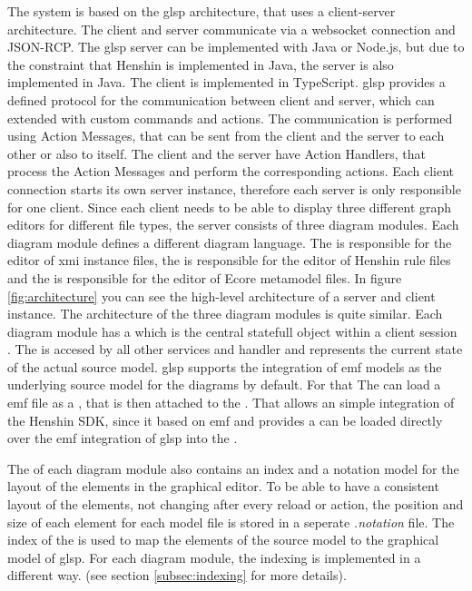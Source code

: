   The system is based on the \ac{glsp} architecture, that uses a client-server architecture. The client and server communicate via a websocket connection and JSON-RCP. The \ac{glsp} server can be implemented with Java or Node.js, but due to the constraint that Henshin is implemented in Java, the server is also implemented in Java. The client is implemented in TypeScript. \ac{glsp} provides a defined protocol for the communication between client and server, which can extended with custom commands and actions. The communication is performed using Action Messages, that can be sent from the client and the server to each other or also to itself. The client and the server have Action Handlers, that process the Action Messages and perform the corresponding actions. Each client connection starts its own server instance, therefore each server is only responsible for one client. \cite{glsp-doc} Since each client needs to be able to display three different graph editors for different file types, the server consists of three diagram modules. Each diagram module defines a different diagram language. The  is responsible for the editor of \ac{xmi} instance files, the  is responsible for the editor of Henshin rule files and the  is responsible for the editor of Ecore metamodel files. In figure \ref{fig:architecture} you can see the high-level architecture of a server and client instance. The architecture of the three diagram modules is quite similar. Each diagram module has a  which is the central statefull object within a client session \cite{glsp-doc}. The  is accesed by all other services and handler and represents the current state of the actual source model. \ac{glsp} supports the integration of \ac{emf} models as the underlying source model for the diagrams by default. For that The  can load a \ac{emf} file as a , that is then attached to the . That allows an simple integration of the Henshin SDK, since it based on \ac{emf} and provides a  can be loaded directly over the \ac{emf} integration of \ac{glsp} into the .

  The  of each diagram module also contains an index and a notation model for the layout of the elements in the graphical editor. To be able to have a consistent layout of the elements, not changing after every reload or action, the position and size of each element for each model file is stored in a seperate \textit{.notation} file. The index of the  is used to map the elements of the source model to the graphical model of \ac{glsp}. For each diagram module, the indexing is implemented in a different way. (see section \ref{subsec:indexing} for more details).

